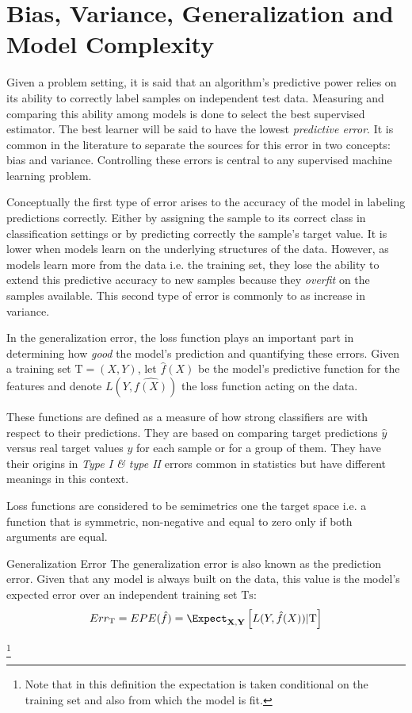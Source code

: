 \section{Bias, Variance, Generalization and Model Complexity}\label{section-biasVariance}

 Given a problem setting, it is said that an algorithm's predictive power relies on its ability to correctly label samples on independent test data. Measuring and comparing this ability among models is done to select the best supervised estimator.  The best learner will be said to have the lowest \textit{predictive error}. It is common in the literature \cite{james-biasVarianceGeneral} to separate the sources for this error in two concepts: bias and variance. Controlling these errors is central to any supervised machine learning problem.
 
 Conceptually the first type of error arises to the accuracy of the model in labeling predictions correctly. Either by assigning the sample to its correct class in classification settings or by predicting correctly the sample's target value. It is lower when models learn on the underlying structures of the data. However, as models learn more from the data i.e. the training set, they lose the ability to extend this predictive accuracy to new samples because they \textit{overfit} on the samples available. This second type of error is commonly to as increase in variance.
 
 In the generalization error, the loss function plays an important part in determining how \textit{good} the model's prediction and quantifying these errors. Given a training set $\mathrm{T} = (X,Y)$, let $\hat{f}(X)$ be the model's predictive function for the features and denote $L( Y,\hat{f(X)} )$ the loss function acting on the data. 
 
 These functions are defined as a measure of how strong classifiers are with respect to their predictions. They are based on comparing target predictions $\hat{y}$ versus real target values $y$ for each sample or for a group of them. They have their origins in \textit{Type I \& type II} errors common in statistics but have different meanings in this context. 
 
Loss functions are considered to be semimetrics one the target space i.e. a function that is symmetric, non-negative and equal to zero only if both arguments are equal.
 
 
 \begin{definition}{Generalization Error}
 	The generalization error is also known as the prediction error. Given that any model is always built on the data, this value is the model's expected error over an independent training set $\mathrm{Ts}$:
 	$$ Err_{\mathrm{T}} =  EPE(\hat{f})= \Expect_{\textbf{X},\textbf{Y}} \left[ L(Y,\hat{f}(X)) |  \mathrm{T}\right]$$
 \end{definition}\footnote{Note that in this definition the expectation is taken conditional on the training set and also from which the model is fit.}
 

